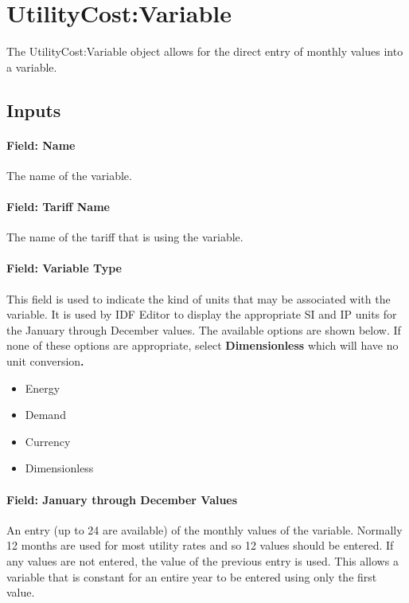 \section{UtilityCost:Variable}\label{utilitycostvariable}

The UtilityCost:Variable object allows for the direct entry of monthly values into a variable.

\subsection{Inputs}\label{inputs-073}

\paragraph{Field: Name}\label{field-name-065}

The name of the variable.

\paragraph{Field: Tariff Name}\label{field-tariff-name-004}

The name of the tariff that is using the variable.

\paragraph{Field: Variable Type}\label{field-variable-type-000}

This field is used to indicate the kind of units that may be associated with the variable. It is used by IDF Editor to display the appropriate SI and IP units for the January through December values. The available options are shown below. If none of these options are appropriate, select \textbf{Dimensionless} which will have no unit conversion\textbf{.}

\begin{itemize}
\item
  Energy
\item
  Demand
\item
  Currency
\item
  Dimensionless
\end{itemize}

\paragraph{Field: January through December Values}\label{field-january-through-december-values}

An entry (up to 24 are available) of the monthly values of the variable. Normally 12 months are used for most utility rates and so 12 values should be entered. If any values are not entered, the value of the previous entry is used. This allows a variable that is constant for an entire year to be entered using only the first value.